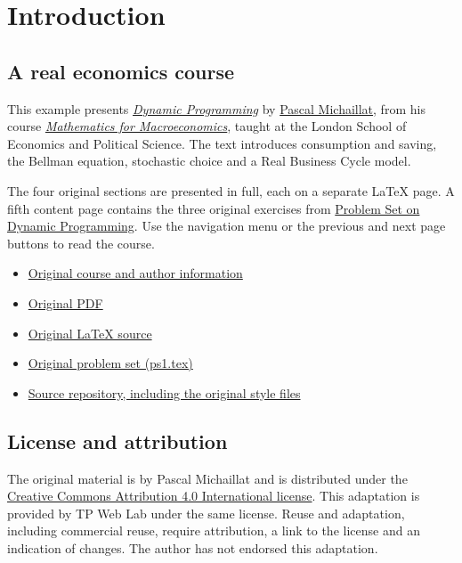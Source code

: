 \usepackage{hyperref}
\section*{Introduction}

\subsection*{A real economics course}
This example presents \href{https://pascalmichaillat.org/x1.pdf}{\emph{Dynamic Programming}} by \href{https://pascalmichaillat.org}{Pascal Michaillat}, from his course \href{https://pascalmichaillat.org/x/}{\emph{Mathematics for Macroeconomics}}, taught at the London School of Economics and Political Science. The text introduces consumption and saving, the Bellman equation, stochastic choice and a Real Business Cycle model.

The four original sections are presented in full, each on a separate LaTeX page. A fifth content page contains the three original exercises from \href{ps1.tex}{Problem Set on Dynamic Programming}. Use the navigation menu or the previous and next page buttons to read the course.

\begin{itemize}
\item \href{https://pascalmichaillat.org/x/}{Original course and author information}
\item \href{https://pascalmichaillat.org/x1.pdf}{Original PDF}
\item \href{https://github.com/pmichaillat/math-for-macro/blob/main/notes1.tex}{Original LaTeX source}
\item \href{https://github.com/pmichaillat/math-for-macro/blob/main/ps1.tex}{Original problem set (ps1.tex)}
\item \href{https://github.com/pmichaillat/math-for-macro}{Source repository, including the original style files}
\end{itemize}

\subsection*{License and attribution}
The original material is by Pascal Michaillat and is distributed under the \href{https://creativecommons.org/licenses/by/4.0/}{Creative Commons Attribution 4.0 International license}. This adaptation is provided by TP Web Lab under the same license. Reuse and adaptation, including commercial reuse, require attribution, a link to the license and an indication of changes. The author has not endorsed this adaptation.

